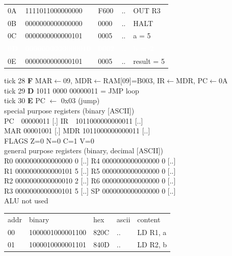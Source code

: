 \begin{tcolorbox}[stepbox, title={Instruction 9 \hfill ticks 25 to 27 \quad ST R2, b}]
{\begin{tabular}{@{}lllll@{}}
0A & 1111011000000000 & F600 & .. & OUT R3\\
0B & 0000000000000000 & 0000 & .. & HALT\\
\rowcolor{datac}0C & 0000000000000101 & 0005 & .. & a = 5\\
\rowcolor{wrt}\textcolor{white}{\textbf{0D}} & \textcolor{white}{\textbf{0000000000000010}} & \textcolor{white}{\textbf{0002}} & \textcolor{white}{\textbf{..}} & \textcolor{white}{\textbf{b = 2}}\\
\rowcolor{datac}0E & 0000000000000101 & 0005 & .. & result = 5\\
\end{tabular}}
\end{tcolorbox}\hfill\begin{tcolorbox}[stepbox, title={Instruction 10 \hfill ticks 28 to 30 \quad JMP loop}]
\textcolor{dim}{tick 28} \textbf{F} MAR$\leftarrow$09, MDR$\leftarrow$RAM[09]=B003, IR$\leftarrow$MDR, PC$\leftarrow$0A\\
\textcolor{dim}{tick 29} \textbf{D} 1011 0000 00000011 = JMP loop\\
\textcolor{dim}{tick 30} \textbf{E} PC $\leftarrow$ 0x03 (jump)\\[2pt]
\textcolor{dim}{special purpose registers (binary [ASCII])}\\
PC~~00000011 [.] \hfill IR~~1011000000000011 [..]\\
MAR 00001001 [.] \hfill MDR 1011000000000011 [..]\\
FLAGS Z=0 N=0 C=1 V=0\\[2pt]
\textcolor{dim}{general purpose registers (binary, decimal [ASCII])}\\
R0 0000000000000000 0 [..] \hfill R4 0000000000000000 0 [..]\\
R1 0000000000000101 5 [..] \hfill R5 0000000000000000 0 [..]\\
R2 0000000000000010 2 [..] \hfill R6 0000000000000000 0 [..]\\
R3 0000000000000101 5 [..] \hfill SP 0000000000000000 0 [..]\\
\textcolor{dim}{ALU not used}\\[2pt]
{\setlength{\tabcolsep}{2pt}\begin{tabular}{@{}lllll@{}}
\textcolor{dim}{addr} & \textcolor{dim}{binary} & \textcolor{dim}{hex} & \textcolor{dim}{ascii} & \textcolor{dim}{content}\\
00 & 1000001000001100 & 820C & .. & LD R1, a\\
01 & 1000010000001101 & 840D & .. & LD R2, b\\

\end{tabular}}
\end{tcolorbox}
